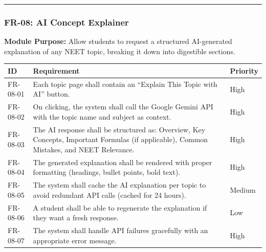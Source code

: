 \documentclass[
]{article}
\begin{document}
\begin{center}\rule{0.5\linewidth}{0.5pt}\end{center}

\subsubsection{FR-08: AI Concept
Explainer}\label{fr-08-ai-concept-explainer}

\textbf{Module Purpose:} Allow students to request a structured
AI-generated explanation of any NEET topic, breaking it down into
digestible sections.

\begin{longtable}[]{@{}
  >{\raggedright\arraybackslash}p{}
  >{\raggedright\arraybackslash}p{}
  >{\raggedright\arraybackslash}p{}@{}}
\toprule\noalign{}
\begin{minipage}[b]{\linewidth}\raggedright
ID
\end{minipage} & \begin{minipage}[b]{\linewidth}\raggedright
Requirement
\end{minipage} & \begin{minipage}[b]{\linewidth}\raggedright
Priority
\end{minipage} \\
\midrule\noalign{}
\endhead
\bottomrule\noalign{}
\endlastfoot
FR-08-01 & Each topic page shall contain an ``Explain This Topic with
AI'' button. & High \\
FR-08-02 & On clicking, the system shall call the Google Gemini API with
the topic name and subject as context. & High \\
FR-08-03 & The AI response shall be structured as: Overview, Key
Concepts, Important Formulas (if applicable), Common Mistakes, and NEET
Relevance. & High \\
FR-08-04 & The generated explanation shall be rendered with proper
formatting (headings, bullet points, bold text). & High \\
FR-08-05 & The system shall cache the AI explanation per topic to avoid
redundant API calls (cached for 24 hours). & Medium \\
FR-08-06 & A student shall be able to regenerate the explanation if they
want a fresh response. & Low \\
FR-08-07 & The system shall handle API failures gracefully with an
appropriate error message. & High \\
\end{longtable}
\end{document}
